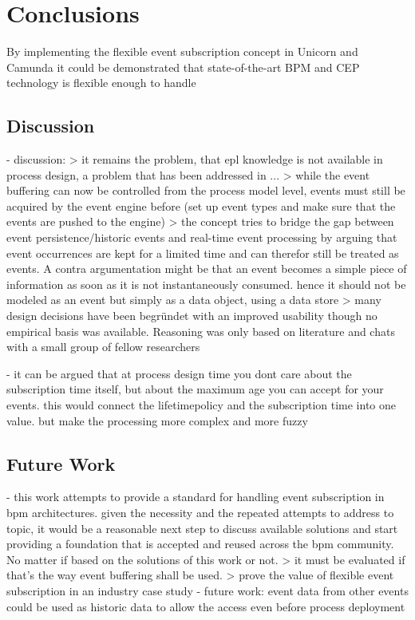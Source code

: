 \chapter{Conclusions}\label{ch:conclusion}



By implementing the flexible event subscription concept in Unicorn and Camunda it could be demonstrated that state-of-the-art BPM and CEP technology is flexible enough to handle 

\section{Discussion}

- discussion:
> it remains the problem, that epl knowledge is not available in process design, a problem that has been addressed in ...
> while the event buffering can now be controlled from the process model level, events must still be acquired by the event engine before (set up event types and make sure that the events are pushed to the engine)
> the concept tries to bridge the gap between event persistence/historic events and real-time event processing by arguing that event occurrences are kept for a limited time and can therefor still be treated as events. A contra argumentation might be that an event becomes a simple piece of information as soon as it is not instantaneously consumed. hence it should not be modeled as an event but simply as a data object, using a data store
> many design decisions have been begründet with an improved usability though no empirical basis was available. Reasoning was only based on literature and chats with a small group of fellow researchers

- it can be argued that at process design time you dont care about the subscription time itself, but about the maximum age you can accept for your events. this would connect the lifetimepolicy and the subscription time into one value. but make the processing more complex and more fuzzy

\section{Future Work}


- this work attempts to provide a standard for handling event subscription in bpm architectures. given the necessity and the repeated attempts to address to topic, it would be a reasonable next step to discuss available solutions and start providing a foundation that is accepted and reused across the bpm community. No matter if based on the solutions of this work or not.
> it must be evaluated if that's the way event buffering shall be used. > prove the value of flexible event subscription in an industry case study
- future work: event data from other events could be used as historic data to allow the access even before process deployment
